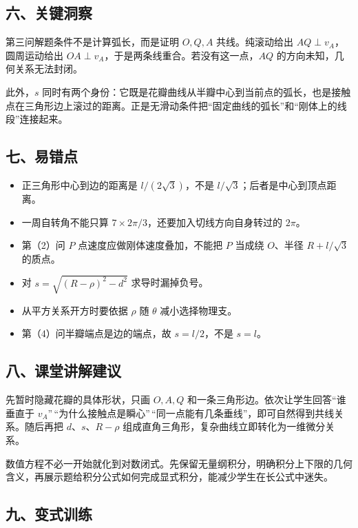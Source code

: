 \documentclass[12pt,a4paper,UTF8]{ctexart}
\newcommand{\tightlist}{\setlength{\itemsep}{0pt}\setlength{\parskip}{0pt}}
\begin{document}
\subsection{六、关键洞察}\label{ux516dux5173ux952eux6d1eux5bdf-1}

第三问解题条件不是计算弧长，而是证明 \(O,Q,A\) 共线。纯滚动给出
\(AQ\perp v_A\)，圆周运动给出
\(OA\perp v_A\)，于是两条线重合。若没有这一点，\(AQ\)
的方向未知，几何关系无法封闭。

此外，\(s\)
同时有两个身份：它既是花瓣曲线从半瓣中心到当前点的弧长，也是接触点在三角形边上滚过的距离。正是无滑动条件把``固定曲线的弧长''和``刚体上的线段''连接起来。

\subsection{七、易错点}\label{ux4e03ux6613ux9519ux70b9-1}

\begin{itemize}
\tightlist
\item
  正三角形中心到边的距离是 \(l/(2\sqrt3)\)，不是
  \(l/\sqrt3\)；后者是中心到顶点距离。
\item
  一周自转角不能只算 \(7\times2\pi/3\)，还要加入切线方向自身转过的
  \(2\pi\)。
\item
  第（2）问 \(P\) 点速度应做刚体速度叠加，不能把 \(P\) 当成绕
  \(O\)、半径 \(R+l/\sqrt3\) 的质点。
\item
  对 \(s=\sqrt{(R-\rho)^2-d^2}\) 求导时漏掉负号。
\item
  从平方关系开方时要依据 \(\rho\) 随 \(\theta\) 减小选择物理支。
\item
  第（4）问半瓣端点是边的端点，故 \(s=l/2\)，不是 \(s=l\)。
\end{itemize}

\subsection{八、课堂讲解建议}\label{ux516bux8bfeux5802ux8bb2ux89e3ux5efaux8bae-1}

先暂时隐藏花瓣的具体形状，只画 \(O,A,Q\)
和一条三角形边。依次让学生回答``谁垂直于
\(v_A\)''\,``为什么接触点是瞬心''\,``同一点能有几条垂线''，即可自然得到共线关系。随后再把
\(d\)、\(s\)、\(R-\rho\)
组成直角三角形，复杂曲线立即转化为一维微分关系。

数值方程不必一开始就化到对数闭式。先保留无量纲积分，明确积分上下限的几何含义，再展示题给积分公式如何完成显式积分，能减少学生在长公式中迷失。

\subsection{九、变式训练}\label{ux4e5dux53d8ux5f0fux8badux7ec3-1}
\end{document}
